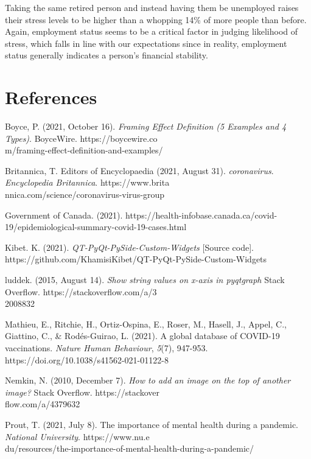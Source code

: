 \documentclass[fontsize=11pt]{article}
\begin{document}
    Taking the same retired person and instead having them be unemployed raises their stress levels to be higher than a whopping 14\% of more people than before. Again, employment status seems to be a critical factor in judging likelihood of stress, which falls in line with our expectations since in reality, employment status generally indicates a person’s financial stability.

    \section*{References}

    \hangindent=0.7cm \noindent
    Boyce, P. (2021, October 16). \textit{Framing Effect Definition (5 Examples and 4 Types)}. BoyceWire.
    https://boycewire.co\\m/framing-effect-definition-and-examples/

    \hangindent=0.7cm \noindent
    Britannica, T. Editors of Encyclopaedia (2021, August 31). \textit{coronavirus}. \textit{Encyclopedia Britannica}.
    https://www.brita\\nnica.com/science/coronavirus-virus-group

    \hangindent=0.7cm \noindent
    Government of Canada. (2021).
    https://health-infobase.canada.ca/covid-19/epidemiological-summary-covid-19-cases.html

    \hangindent=0.7cm \noindent
    Kibet. K. (2021). \textit{QT-PyQt-PySide-Custom-Widgets} [Source code].
    https://github.com/KhamisiKibet/QT-PyQt-PySide-Custom-Widgets

    \hangindent=0.7cm \noindent
    luddek. (2015, August 14). \textit{Show string values on x-axis in pyqtgraph} Stack Overflow.
    https://stackoverflow.com/a/3\\2008832

    \hangindent=0.7cm \noindent
    Mathieu, E., Ritchie, H., Ortiz-Ospina, E., Roser, M., Hasell, J., Appel, C., Giattino, C., \& Rodés-Guirao, L. (2021). A global database of COVID-19 vaccinations. \textit{Nature Human Behaviour}, \textit{5}(7), 947-953. \\
    https://doi.org/10.1038/s41562-021-01122-8

    \hangindent=0.7cm \noindent
    Nemkin, N. (2010, December 7). \textit{How to add an image on the top of another image?} Stack Overflow.
    https://stackover\\flow.com/a/4379632

    \hangindent=0.7cm \noindent
    Prout, T. (2021, July 8). The importance of mental health during a pandemic. \textit{National University}.
    https://www.nu.e\\du/resources/the-importance-of-mental-health-during-a-pandemic/
\end{document}
